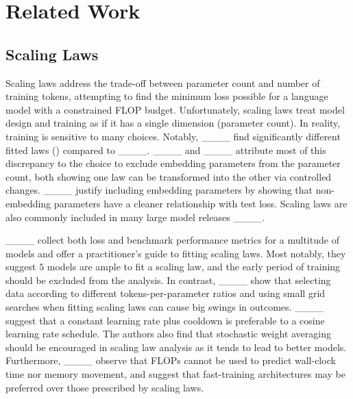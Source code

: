 \section{Related Work}
\label{sec:related_work}
\subsection{Scaling Laws}
Scaling laws address the trade-off between parameter count and number of training tokens, attempting to find the minimum loss possible for a language model with a constrained FLOP budget.
Unfortunately, scaling laws treat model design and training as if it has a single dimension (parameter count).  In reality, training is sensitive to many choices. 
Notably, ____ find significantly different 
fitted laws () compared to ____.
____ and ____ attribute most of this discrepancy to the choice to exclude embedding parameters from the parameter count, both showing one law can be transformed into the other via controlled changes.
____ justify including embedding parameters by showing that non-embedding parameters have a cleaner relationship with test loss. %
Scaling laws are also commonly included in many large model releases ____.

____ collect both loss and benchmark performance metrics for a multitude of models and offer a practitioner's guide to fitting scaling laws.
Most notably, they suggest \(5\) models are ample to fit a scaling law, and the early period of training should be excluded from the analysis.
In contrast, ____ show that selecting data according to different tokens-per-parameter ratios and using small grid searches when fitting scaling laws can cause big swings in outcomes.
____ suggest that a constant learning rate plus cooldown is preferable to a cosine learning rate schedule.
The authors also find that stochastic weight averaging should be encouraged in scaling law analysis as it tends to lead to better models.
Furthermore, ____ observe that FLOPs cannot be used to predict wall-clock time nor memory movement, and suggest that fast-training architectures may be preferred over those prescribed by scaling laws.

